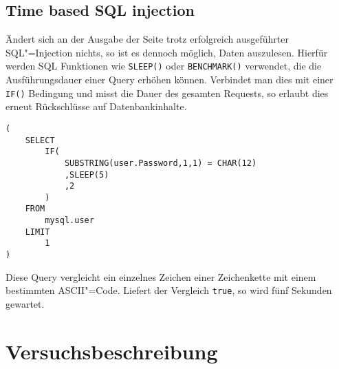 \section{Time based SQL injection}

Ändert sich an der Ausgabe der Seite trotz erfolgreich ausgeführter SQL"=Injection nichts, so ist es dennoch möglich, Daten auszulesen. Hierfür werden SQL Funktionen wie \texttt{SLEEP()} oder \texttt{BENCHMARK()} verwendet, die die Ausführungsdauer einer Query erhöhen können. Verbindet man dies mit einer \texttt{IF()} Bedingung und misst die Dauer des gesamten Requests, so erlaubt dies erneut Rückschlüsse auf Datenbankinhalte.

\begin{listing}
\begin{margincap}
\begin{verbatim}
(
    SELECT
        IF(
            SUBSTRING(user.Password,1,1) = CHAR(12)
            ,SLEEP(5)
            ,2
        )
    FROM
        mysql.user
    LIMIT
        1
)
\end{verbatim}
\caption[timebased]{Diese Query vergleicht ein einzelnes Zeichen einer Zeichenkette mit einem bestimmten ASCII"=Code. Liefert der Vergleich \texttt{true}, so wird fünf Sekunden gewartet.}
\label{lst:time_based}
\end{margincap}
\end{listing}

\chapter{Versuchsbeschreibung}

